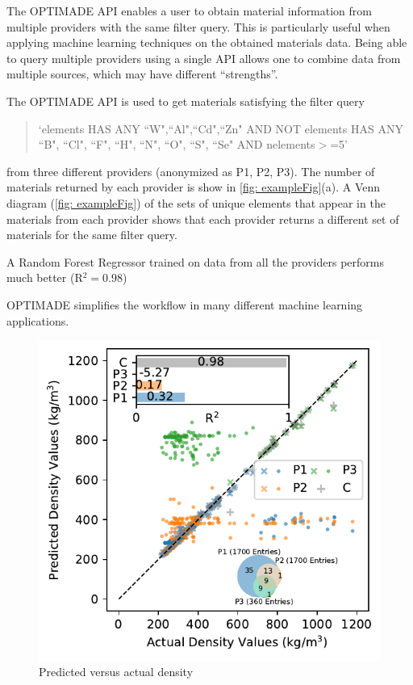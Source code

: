 \documentclass{article}
\begin{document}
	The OPTIMADE API enables a user to obtain material information from multiple providers with the same filter query. This is particularly useful when applying machine learning techniques on the obtained materials data. Being able to query multiple providers using a single API allows one to combine data from multiple sources, which may have different ``strengths''.
	
	The OPTIMADE API is used to get materials satisfying the filter query 
	
	\begin{quote}
		`elements HAS ANY ``W",``Al",``Cd",``Zn" AND NOT elements HAS ANY ``B", ``Cl", ``F", ``H", ``N", ``O", ``S", ``Se" AND nelements$>$=5'		
	\end{quote}
	
	from three different providers (anonymized as P1, P2, P3). The number of materials returned by each provider is show in \autoref{fig: exampleFig}(a). A Venn diagram (\autoref{fig: exampleFig}) of the sets of unique elements that appear in the materials from each provider shows that each provider returns a different set of materials for the same filter query.
	
	
	
	A Random Forest Regressor trained on data from all the providers performs much better (R$^2 = 0.98$) 
	
	OPTIMADE simplifies the workflow in many different machine learning applications. 
	\begin{figure}[h]
		\centering
		\includegraphics[]{scatterPlot.pdf}
		\caption{Predicted versus actual density} 
		\label{fig: exampleFig}
	\end{figure}
\end{document}
